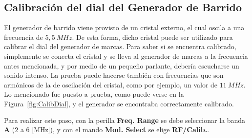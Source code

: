   \subsection{Calibración del dial del Generador de Barrido}
    El generador de barrido viene provisto de un cristal externo, el cual oscila a una frecuencia de $5,5~MHz$.
    De esta forma, dicho cristal puede ser utilizado para calibrar el dial del generador de marcas. Para saber
    si se encuentra calibrado, simplemente se conecta el cristal y se lleva al generador de marcas a la frecuencia
    antes mencionada, y por medio de un pequeño parlante, debería escucharse un sonido intenso. La prueba puede
    hacerse también con frecuencias que son armónicos de la de oscilación del cristal, como por ejemplo, un 
    valor de $11~MHz$. Lo mencionado fue puesto a prueba, como puede verse en la Figura~\ref{fig:CalibDial},
    y el generador se encontraba correctamente calibrado.
    
    Para realizar este paso, con la perilla \textbf{Freq. Range} se debe seleccionar la banda \textbf{A} (2 a 6 [MHz]), y 
    con el mando \textbf{Mod. Select} se elige \textbf{RF/Calib.}.

